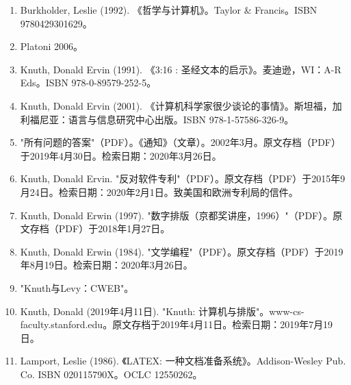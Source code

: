 \begin{enumerate}
\item Burkholder, Leslie (1992). 《哲学与计算机》。Taylor & Francis。ISBN 9780429301629。
\item Platoni 2006。
\item Knuth, Donald Ervin (1991). 《3:16 : 圣经文本的启示》。麦迪逊，WI：A-R Eds。ISBN 978-0-89579-252-5。
\item Knuth, Donald Ervin (2001). 《计算机科学家很少谈论的事情》。斯坦福，加利福尼亚：语言与信息研究中心出版。ISBN 978-1-57586-326-9。
\item "所有问题的答案"（PDF）。《通知》（文章）。2002年3月。原文存档（PDF）于2019年4月30日。检索日期：2020年3月26日。
\item Knuth, Donald Ervin. "反对软件专利"（PDF）。原文存档（PDF）于2015年9月24日。检索日期：2020年2月1日。致美国和欧洲专利局的信件。
\item Knuth, Donald Erwin (1997). "数字排版（京都奖讲座，1996）"（PDF）。原文存档（PDF）于2018年1月27日。
\item Knuth, Donald Erwin (1984). "文学编程"（PDF）。原文存档（PDF）于2019年8月19日。检索日期：2020年3月26日。
\item "Knuth与Levy：CWEB"。
\item Knuth, Donald (2019年4月11日). "Knuth: 计算机与排版"。www-cs-faculty.stanford.edu。原文存档于2019年4月11日。检索日期：2019年7月19日。
\item Lamport, Leslie (1986). 《LATEX: 一种文档准备系统》。Addison-Wesley Pub. Co. ISBN 020115790X。OCLC 12550262。


\end{enumerate}

